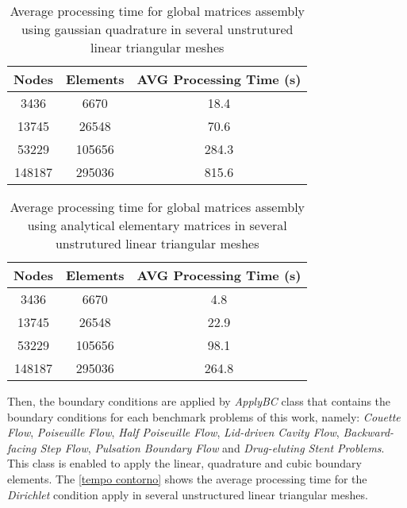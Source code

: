 \vspace{0.5cm}
\begin{table}[H]
\centering
\begin{tabular}{ccc}
\toprule
\textbf{Nodes} & \textbf{Elements} & \textbf{AVG Processing Time} (s) \\
\midrule
3436 & 6670 & 18.4 \\
13745 & 26548 & 70.6 \\
53229 & 105656 & 284.3 \\
148187 & 295036 & 815.6 \\



\bottomrule
\end{tabular}
\caption{Average processing time for global matrices assembly using gaussian quadrature in several unstrutured linear triangular meshes}
\label{tempo matrizes globais gauss}
\end{table}

\vspace{0.5cm}
\begin{table}[H]
\centering
\begin{tabular}{ccc}
\toprule
\textbf{Nodes} & \textbf{Elements} & \textbf{AVG Processing Time} (s) \\
\midrule
3436 & 6670 & 4.8 \\
13745 & 26548 & 22.9 \\
53229 & 105656 & 98.1 \\
148187 & 295036 & 264.8 \\



\bottomrule
\end{tabular}
\caption{Average processing time for global matrices assembly using analytical elementary matrices in several unstrutured linear triangular meshes}
\label{tempo matrizes globais analytical}
\end{table}



\medskip
Then, the boundary conditions are applied by \textit{ApplyBC} class
that contains the boundary conditions
for each benchmark problems of this
work, namely:
\textit{Couette Flow}, 
\textit{Poiseuille Flow}, 
\textit{Half Poiseuille Flow}, 
\textit{Lid-driven Cavity Flow}, 
\textit{Backward-facing Step Flow}, 
\textit{Pulsation Boundary Flow} and
\textit{Drug-eluting Stent Problems}. 
This class is enabled to apply 
the linear, quadrature and cubic boundary elements.
The \ref{tempo contorno} 
shows the average processing time for the \textit{Dirichlet} 
condition apply in several unstructured linear triangular meshes.

